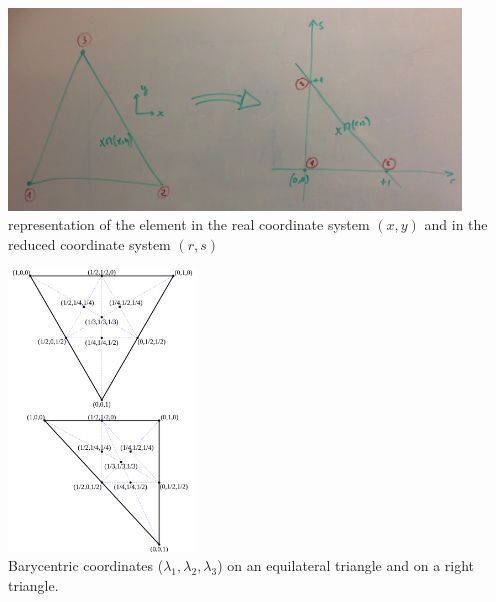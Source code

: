\begin{center}
\includegraphics[width=12cm]{images/mini/minielement2.JPG}\\
{\small representation of the element in the real coordinate system $(x,y)$
and in the reduced coordinate system $(r,s)$}
\end{center}

\begin{center}
\includegraphics[width=5cm]{images/mini/barycoord}\\
{\small Barycentric coordinates ($\lambda _{1},\lambda _{2},\lambda _{3}$) on an equilateral triangle and on a right triangle.}
\end{center}


